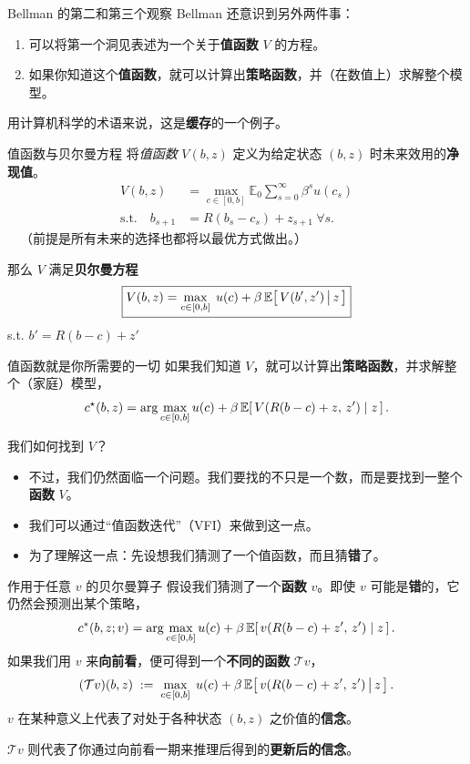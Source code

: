 \documentclass[10pt,aspectratio=169]{beamer}
\begin{document}
\begin{frame}{Bellman 的第二和第三个观察}
  Bellman 还意识到另外两件事：
  \begin{enumerate}
    \item[2.] 可以将第一个洞见表述为一个关于\textbf{值函数} $V$ 的方程。
    \item[3.] 如果你知道这个\textbf{值函数}，就可以计算出\textbf{策略函数}，并（在数值上）求解整个模型。
  \end{enumerate}
  用计算机科学的术语来说，这是\textbf{缓存}的一个例子。
\end{frame}

\begin{frame}{值函数与贝尔曼方程}
  将\emph{值函数} $V(b, z)$ 定义为给定状态 $(b, z)$ 时未来效用的\textbf{净现值}。
  \begin{align*}
    V(b, z) &= \max_{c\in[0,b]} \mathbb{E}_0 \sum_{s=0}^\infty \beta^{s} u(c_s)\\
    \text{s.t.} \quad b_{s+1} &= R(b_s - c_s) + z_{s+1}\ \forall s.
  \end{align*}
  $\quad$（前提是所有未来的选择也都将以最优方式做出。）

  那么 $V$ 满足\textbf{贝尔曼方程}
  \[
    \boxed{V(b, z) = \max_{c \in [0, b]} \; u(c) + \beta \, \mathbb{E}\!\left[\, V(b', z') \,\big|\, z \,\right]}
  \]
  s.t. $b' = R(b-c) + z'$
\end{frame}

\begin{frame}{值函数就是你所需要的一切}
  如果我们知道 $V$，就可以计算出\textbf{策略函数}，并求解整个（家庭）模型，
  \[
  c^\star(b, z) = \arg\max_{c \in [0, b]} u(c) + \beta \, \mathbb{E}\!\left[\, V(R(b-c) + z,\, z') \mid z \,\right].
  \]
\end{frame}

\begin{frame}{我们如何找到 $V$？}
  \begin{itemize}
    \item 不过，我们仍然面临一个问题。我们要找的不只是一个数，而是要找到一整个\textbf{函数} $V$。
    \item 我们可以通过“值函数迭代”（VFI）来做到这一点。
    \item 为了理解这一点：先设想我们猜测了一个值函数，而且猜\textbf{错}了。
  \end{itemize}

\end{frame}

\begin{frame}{作用于任意 $v$ 的贝尔曼算子}
  假设我们猜测了一个\textbf{函数} $v$。即使 $v$ 可能是\textbf{错}的，它仍然会预测出某个策略，
  \[
    c^*(b, z; v) = \arg\max_{c \in [0, b]} u(c) + \beta \, \mathbb{E}\!\left[\, v(R(b-c) + z',\, z') \mid z \,\right].
  \]
  如果我们用 $v$ 来\textbf{向前看}，便可得到一个\textbf{不同的函数} $\mathcal{T}v$，
  \[
    (\mathcal{T} v)(b, z) \;:=\; \max_{c \in [0, b]} \; u(c) + \beta \, \mathbb{E}\!\left[\, v(R(b-c) + z',\, z') \,\big|\, z \,\right].
  \]
  $v$ 在某种意义上代表了对处于各种状态 $(b, z)$ 之价值的\textbf{信念}。

  $\mathcal{T}v$ 则代表了你通过向前看一期来推理后得到的\textbf{更新后的信念}。
\end{frame}
\end{document}
